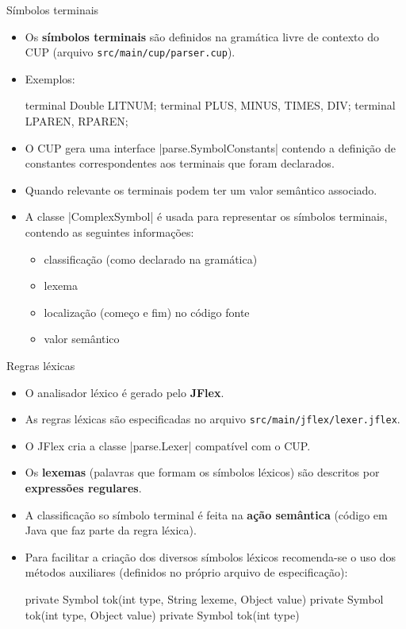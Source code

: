 \begin{frame}{Símbolos terminais}
  \begin{itemize}
    \item Os \textbf{símbolos terminais} são definidos na gramática
    livre de contexto do CUP (arquivo
    \texttt{src/main/cup/parser.cup}).
    \item Exemplos:
\begin{pygmented}[]
terminal Double LITNUM;
terminal        PLUS, MINUS, TIMES, DIV;
terminal        LPAREN, RPAREN;
\end{pygmented}
    
    \item O CUP gera uma interface \pyginline|parse.SymbolConstants|
    contendo a definição de constantes correspondentes aos terminais
    que foram declarados.
    
    \item Quando relevante os terminais podem ter um valor semântico
    associado.

    \item A classe \pyginline|ComplexSymbol| é usada para representar
    os símbolos terminais, contendo as seguintes informações:
    \begin{itemize}
      \item classificação (como declarado na gramática)
      \item lexema
      \item localização (começo e fim) no código fonte
      \item valor semântico
    \end{itemize}
  \end{itemize}
\end{frame}

\begin{frame}{Regras léxicas}
  \begin{itemize}
    \item O analisador léxico é gerado pelo \textbf{JFlex}.
    \item As regras léxicas são especificadas no arquivo
    \alert{\texttt{src/main/jflex/lexer.jflex}}.
    \item O JFlex cria a classe \pyginline|parse.Lexer| compatível com
    o CUP.
    \item Os \textbf{lexemas} (palavras que formam os símbolos
    léxicos) são descritos por \textbf{expressões regulares}.
    \item A classificação so símbolo terminal é feita na \textbf{ação
      semântica} (código em Java que faz parte da regra léxica).
    \item Para facilitar a criação dos diversos símbolos léxicos
    recomenda-se o uso dos \alert{métodos auxiliares} (definidos no
    próprio arquivo de especificação):
\begin{pygmented}[]
private Symbol tok(int type, String lexeme, Object value)
private Symbol tok(int type, Object value)
private Symbol tok(int type)
\end{pygmented}
  \end{itemize}
\end{frame}


